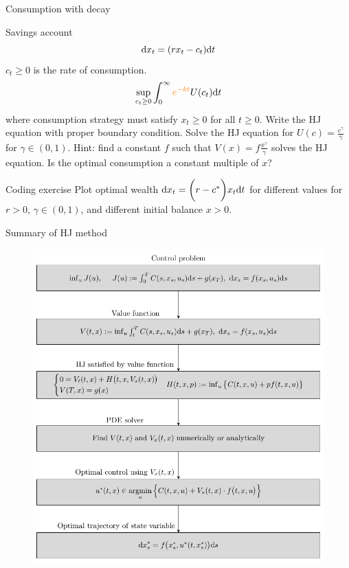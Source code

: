 \documentclass[color=usenames,dvipsnames]{beamer}
\newcommand{\dd}{\text{\normalfont d}}
\newcommand{\dt}{\text{\normalfont d}t}
\newcommand{\dx}{\text{\normalfont d}x}
\begin{document}
\begin{frame}{Consumption with decay}
    \begin{block}
        {Savings account}
        \[
        \dd{x}_t = (rx_t - c_t)\dt
        \]
        $c_t\ge0$ is the rate of consumption.
        \[
        \sup_{c_t\ge0} \int_0^\infty {\color{orange}e^{-kt}}U(c_t)\dt
        \]
        where consumption strategy must satisfy $x_t\ge0$ for all $t\ge0$.
        Write the HJ equation with proper boundary condition. Solve the HJ equation for $U(c)=\frac{c^\gamma}{\gamma}$ for $\gamma\in(0,1)$. Hint: find a constant $f$ such that $V(x)=f\frac{x^\gamma}{\gamma}$ solves the HJ equation. Is the optimal consumption a constant multiple of $x$?
    \end{block}
    \begin{block}
    {Coding exercise}
        Plot optimal wealth 
        $\dx_t = \bigg(r - c^*\bigg)x_t\dt$
        for different values for $r>0$, $\gamma\in(0,1)$, and different initial balance $x>0.$
\end{block}
\end{frame}
\begin{frame}{Summary of HJ method}
    \begin{figure}
        \centering
        \includegraphics[height=0.75\textheight]{Control_lecture_notes/Figs/HJ_chart.pdf}
    \end{figure}
\end{frame}
\end{document}
